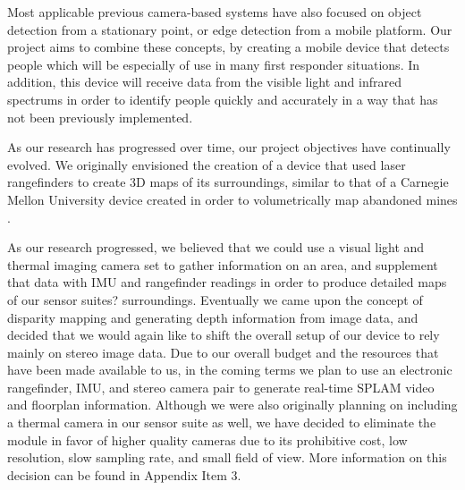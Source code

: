 Most applicable previous camera-based systems have also focused on object detection from a stationary point, or edge detection from a mobile platform. Our project aims to combine these concepts, by creating a mobile device that detects people which will be especially of use in many first responder situations. In addition, this device will receive data from the visible light and infrared spectrums in order to identify people quickly and accurately in a way that has not been previously implemented.
\par
As our research has progressed over time, our project objectives have continually evolved. We originally envisioned the creation of a device that used laser rangefinders to create 3D maps of its surroundings, similar to that of a Carnegie Mellon University device created in order to volumetrically map abandoned mines \cite{thrun}.
\par
As our research progressed, we believed that we could use a visual light and thermal imaging camera set to gather information on an area, and supplement that data with IMU and rangefinder readings in order to produce detailed maps of our sensor suites? surroundings. Eventually we came upon the concept of disparity mapping and generating depth information from image data, and decided that we would again like to shift the overall setup of our device to rely mainly on stereo image data. Due to our overall budget and the resources that have been made available to us, in the coming terms we plan to use an electronic rangefinder, IMU, and stereo camera pair to generate real-time SPLAM video and floorplan information. Although we were also originally planning on including a thermal camera in our sensor suite as well, we have decided to eliminate the module in favor of higher quality cameras due to its prohibitive cost, low resolution, slow sampling rate, and small field of view. More information on this decision can be found in Appendix Item 3.


